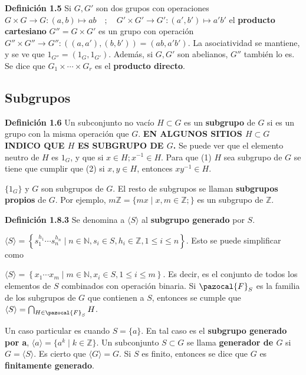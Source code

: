 \documentclass[a4paper, 11pt]{extarticle}
\newcommand{\defi}[1]{\textcolor{azul}{\textbf{Definición #1}}}
\let\mathcal\pazocal
\begin{document}
\defi{1.5} Si \(G,G'\) son dos grupos con operaciones
\(G \times G \rightarrow G: (a,b) \mapsto ab \quad;\quad G' \times G' \rightarrow G': (a', b') \mapsto a'b'\)
 el \textbf{producto cartesiano} \(G'' = G \times G'\) es un grupo con operación 
\(G'' \times G'' \rightarrow G'': ((a, a'), (b, b')) = (ab, a'b')\). La asociatividad se mantiene, 
y se ve que \(1_{G''} = (1_G, 1_{G'})\).
Además, si \(G, G'\) son abelianos, \(G''\) también lo es. Se dice que \(G_1 \times \cdots \times G_r\) es el \textbf{producto directo}.

\subsection*{Subgrupos}
\label{sec:org4b67404}
\defi{1.6} Un subconjunto no vacío \(H \subset G\) es un \textbf{subgrupo} de \(G\) si es un grupo con la misma operación que \(G\).
\textbf{EN ALGUNOS SITIOS \(H \subset G\) INDICO QUE \(H\) ES SUBGRUPO DE \(G\).}
Se puede ver que el elemento neutro de \(H\) es \(1_G\), y que si \(x \in H;
x^{-1} \in H\). Para que (1) \(H\) sea subgrupo de \(G\) se tiene que cumplir que
(2) si \(x,y \in H\), entonces \(x y^{-1} \in H\).

\(\{ 1_G \}\) y \(G\) son subgrupos de \(G\). El resto de subgrupos se
llaman \textbf{subgrupos propios} de \(G\). Por ejemplo, \(m \mathbb{Z} = \{ mx \;|\;
x,m \in \mathbb{Z}; 
\}\) es un subgrupo de \(\mathbb{Z}\). 

\defi{1.8.3} Se denomina a \(\langle S \rangle\) al \textbf{subgrupo generado} por \(S\). 


\(\langle S \rangle  = \left\{ s_1^{h_1} \cdots s_n^{h_n} \;|\; n \in \mathbb{N} , s_i \in S, h_i \in \mathbb{Z}
 , 1 \le i \le n
 \right\}\). Esto se puede simplificar como


\(\langle S \rangle  = \left\{ x_1 \cdots x_m \;|\; m \in \mathbb{N} , x_i \in S,  1 \le i \le m
 \right\}\). Es decir, es el conjunto de todos 
 los elementos de \(S\) combinados con operación binaria. Si \(\mathcal{F}_S\) es la
familia de los subgrupos de \(G\) que contienen a \(S\), entonces se cumple
que \(\langle S \rangle = \bigcap_{H \in \mathcal{F}_S}^{} H\).

Un caso particular es cuando \(S = \{ a \}\). En tal caso es el \textbf{subgrupo
generado por a}, \(\langle a \rangle = \{ a^k \;|\; k \in \mathbb{Z}\}\). Un subconjunto \(S \subset G\) se llama \textbf{generador de \(G\)} si \(G = \langle S \rangle\). Es cierto que
\(\langle G \rangle = G\). Si \(S\) es finito, entonces se dice que \(G\) es \textbf{finitamente generado}.
\end{document}
